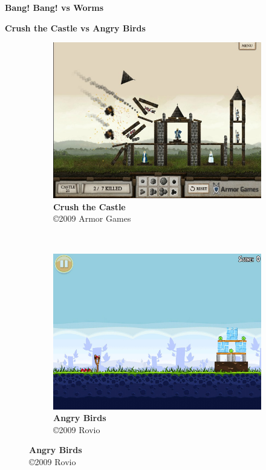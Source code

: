 \expandafter\documentclass\expandafter[table, usenames, svgnames, dvipsnames, \classopts]{beamer}
\begin{document}
\begin{frame}{\textbf{Bang! Bang! vs Worms}}

\end{frame}

\begin{frame}{\textbf{Crush the Castle vs Angry Birds}}

	\begin{figure}
	    \centering

	    \begin{subfigure}[!h]{0.4\paperwidth}
	    	\centering
	    	\includegraphics[height=0.4\paperheight]{crush-castle-screenshot}
	        \caption{\scriptsize\textbf{Crush the Castle}\\\copyright{2009} Armor Games\footnotemark{}}
	    \end{subfigure}
	    ~
		\begin{subfigure}[!h]{0.4\paperwidth}
			\centering
	        \includegraphics[height=0.4\paperheight]{angry-birds-screenshot}
	        \caption{\scriptsize\textbf{Angry Birds}\\\copyright{2009} Rovio\footnotemark{}}
	    \end{subfigure}
    \end{figure}


\end{frame}
\end{document}
